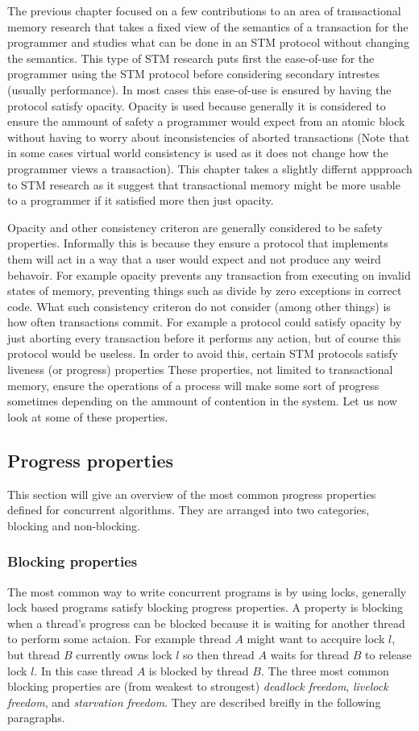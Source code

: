 The previous chapter focused on a few contributions to an area of transactional
memory research that takes a fixed view of the semantics of a transaction for the programmer
and studies what can be done in an STM protocol without changing the semantics.
This type of STM research puts first the ease-of-use for the programmer using the STM protocol
before considering secondary intrestes (usually performance).
In most cases this ease-of-use is ensured by having the protocol satisfy opacity.
Opacity is used because generally it is considered
to ensure the ammount of safety a programmer would expect from an atomic block without having
to worry about inconsistencies of aborted transactions
(Note that in some cases virtual world consistency is used as it does not change
how the programmer views a transaction).
This chapter takes a slightly differnt appproach to STM research as it suggest that transactional
memory might be more usable to a programmer if it satisfied more then just opacity.

Opacity and other consistency criteron are generally considered to be safety properties.
Informally this is because they ensure a protocol that implements them will
act in a way that a user would expect and not produce any weird behavoir.
For example opacity prevents any transaction from executing on invalid states of memory, preventing
things such as divide by zero exceptions in correct code.
What such consistency criteron do not consider (among other things) is how often transactions commit.
For example a protocol could satisfy opacity by just aborting every transaction before it performs
any action, but of course this protocol would be useless.
In order to avoid this, certain STM protocols satisfy liveness (or progress) properties
These properties, not limited to transactional memory, ensure the operations of a process
will make some sort of progress sometimes depending on the ammount of contention in the system.
Let us now look at some of these properties.

\subsection{Progress properties}
This section will give an overview of the most common progress properties defined
for concurrent algorithms.
They are arranged into two categories, blocking and non-blocking.

\subsubsection{Blocking properties}
The most common way to write concurrent programs is by using locks,
generally lock based programs satisfy blocking progress properties.
A property is blocking when a thread's progress can be blocked because it is waiting
for another thread to perform some actaion.
For example thread $A$ might want to accquire lock $l$, but thread $B$ currently owns lock $l$
so then thread $A$ waits for thread $B$ to release lock $l$.
In this case thread $A$ is blocked by thread $B$.
The three most common blocking properties are (from weakest to
strongest) \emph{deadlock freedom}, \emph{livelock freedom},
and \emph{starvation freedom}.
They are described breifly in the following paragraphs.

